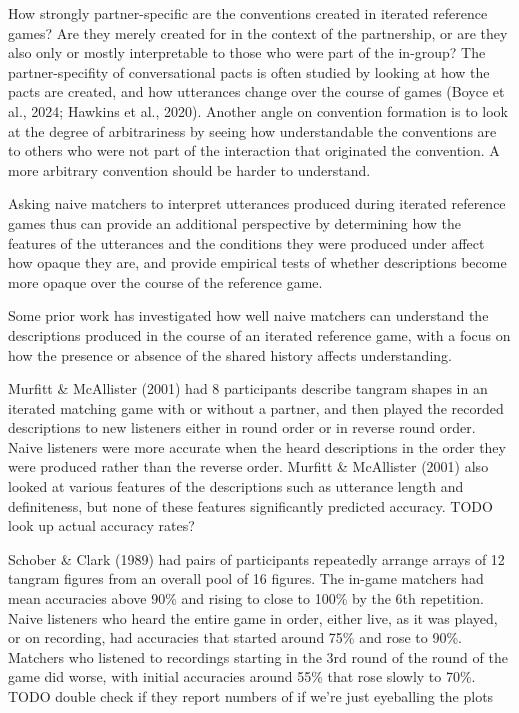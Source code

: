 \documentclass[10pt, letterpaper]{article}
\begin{document}
How strongly partner-specific are the conventions created in iterated
reference games? Are they merely created for in the context of the
partnership, or are they also only or mostly interpretable to those who
were part of the in-group? The partner-specifity of conversational pacts
is often studied by looking at how the pacts are created, and how
utterances change over the course of games (Boyce et al., 2024; Hawkins
et al., 2020). Another angle on convention formation is to look at the
degree of arbitrariness by seeing how understandable the conventions are
to others who were not part of the interaction that originated the
convention. A more arbitrary convention should be harder to understand.

Asking naive matchers to interpret utterances produced during iterated
reference games thus can provide an additional perspective by
determining how the features of the utterances and the conditions they
were produced under affect how opaque they are, and provide empirical
tests of whether descriptions become more opaque over the course of the
reference game.

Some prior work has investigated how well naive matchers can understand
the descriptions produced in the course of an iterated reference game,
with a focus on how the presence or absence of the shared history
affects understanding.

Murfitt \& McAllister (2001) had 8 participants describe tangram shapes
in an iterated matching game with or without a partner, and then played
the recorded descriptions to new listeners either in round order or in
reverse round order. Naive listeners were more accurate when the heard
descriptions in the order they were produced rather than the reverse
order. Murfitt \& McAllister (2001) also looked at various features of
the descriptions such as utterance length and definiteness, but none of
these features significantly predicted accuracy. TODO look up actual
accuracy rates?

Schober \& Clark (1989) had pairs of participants repeatedly arrange
arrays of 12 tangram figures from an overall pool of 16 figures. The
in-game matchers had mean accuracies above 90\% and rising to close to
100\% by the 6th repetition. Naive listeners who heard the entire game
in order, either live, as it was played, or on recording, had accuracies
that started around 75\% and rose to 90\%. Matchers who listened to
recordings starting in the 3rd round of the round of the game did worse,
with initial accuracies around 55\% that rose slowly to 70\%. TODO
double check if they report numbers of if we're just eyeballing the
plots
\end{document}

